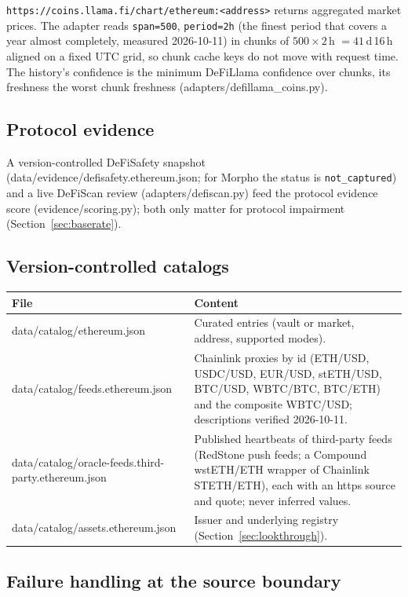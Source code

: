 \documentclass[11pt,a4paper]{article}
\newcommand{\code}[1]{\texttt{#1}}
\newcommand{\src}[1]{\textsf{\small #1}}
\begin{document}
\code{https://coins.llama.fi/chart/ethereum:<address>} returns aggregated market
prices. The adapter reads \code{span=500}, \code{period=2h} (the finest period
that covers a year almost completely, measured 2026-10-11) in chunks of
$500\times2$\,h $=41$\,d\,16\,h aligned on a fixed UTC grid, so chunk cache keys do
not move with request time. The history's confidence is the minimum DeFiLlama
confidence over chunks, its freshness the worst chunk freshness
(\src{adapters/defillama\_coins.py}).

\subsection{Protocol evidence}

A version-controlled DeFiSafety snapshot (\src{data/evidence/defisafety.ethereum.json};
for Morpho the status is \code{not\_captured}) and a live DeFiScan review
(\src{adapters/defiscan.py}) feed the protocol evidence score
(\src{evidence/scoring.py}); both only matter for protocol impairment
(Section~\ref{sec:baserate}).

\subsection{Version-controlled catalogs}

\begin{center}\small
\begin{tabularx}{\textwidth}{@{}L{5.6cm}Y@{}}
\toprule
File & Content \\
\midrule
\src{data/catalog/ethereum.json} & Curated entries (vault or market, address, supported modes). \\
\src{data/catalog/feeds.ethereum.json} & Chainlink proxies by id (ETH/USD, USDC/USD, EUR/USD, stETH/USD, BTC/USD, WBTC/BTC, BTC/ETH) and the composite WBTC/USD; descriptions verified 2026-10-11. \\
\src{data/catalog/oracle-feeds.third-party.ethereum.json} & Published heartbeats of third-party feeds (RedStone push feeds; a Compound wstETH/ETH wrapper of Chainlink STETH/ETH), each with an https source and quote; never inferred values. \\
\src{data/catalog/assets.ethereum.json} & Issuer and underlying registry (Section~\ref{sec:lookthrough}). \\
\bottomrule
\end{tabularx}
\end{center}

\subsection{Failure handling at the source boundary}
\end{document}
